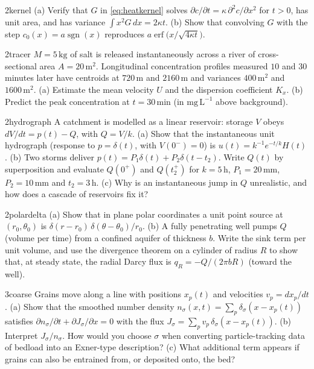 \documentclass[11pt,letterpaper]{article}
\numberwithin{equation}{section}
\newcommand{\units}[1]{\,\mathrm{#1}}
\DeclareMathOperator{\erf}{erf}
\DeclareMathOperator{\sgn}{sgn}
\begin{document}
\begin{exercise}{2}{kernel}
(a) Verify that $G$ in \eqref{eq:heatkernel} solves $\partial c/\partial t=\kappa\,\partial^2c/\partial x^2$ for $t>0$, has unit area, and has
variance $\int x^2G\,dx=2\kappa t$.
(b) Show that convolving $G$ with the step $c_0(x)=a\sgn(x)$ reproduces $a\erf\big(x/\sqrt{4\kappa t}\big)$.
\end{exercise}

\begin{exercise}{2}{tracer}
$M=5\units{kg}$ of salt is released instantaneously across a river of cross-sectional area $A=20\units{m^2}$. Longitudinal
concentration profiles measured $10$ and $30$ minutes later have centroids at $720\units{m}$ and $2160\units{m}$ and variances
$400\units{m^2}$ and $1600\units{m^2}$.
(a) Estimate the mean velocity $U$ and the dispersion coefficient $K_x$.
(b) Predict the peak concentration at $t=30\units{min}$ (in $\mathrm{mg\,L^{-1}}$ above background).
\end{exercise}

\begin{exercise}{2}{hydrograph}
A catchment is modelled as a linear reservoir: storage $V$ obeys $dV/dt=p(t)-Q$, with $Q=V/k$.
(a) Show that the instantaneous unit hydrograph (response to $p=\delta(t)$, with $V(0^-)=0$) is $u(t)=k^{-1}e^{-t/k}H(t)$.
(b) Two storms deliver $p(t)=P_1\delta(t)+P_2\delta(t-t_2)$. Write $Q(t)$ by superposition and evaluate $Q(0^+)$ and
$Q(t_2^+)$ for $k=5\units{h}$, $P_1=20\units{mm}$, $P_2=10\units{mm}$ and $t_2=3\units{h}$.
(c) Why is an instantaneous jump in $Q$ unrealistic, and how does a cascade of reservoirs fix it?
\end{exercise}

\begin{exercise}{2}{polardelta}
(a) Show that in plane polar coordinates a unit point source at $(r_0,\theta_0)$ is $\delta(r-r_0)\,\delta(\theta-\theta_0)/r_0$.
(b) A fully penetrating well pumps $Q$ (volume per time) from a confined aquifer of thickness $b$. Write the sink term per
unit volume, and use the divergence theorem on a cylinder of radius $R$ to show that, at steady state, the radial Darcy flux is
$q_R=-Q/(2\pi bR)$ (toward the well).
\end{exercise}

\begin{exercise}{3}{coarse}
Grains move along a line with positions $x_p(t)$ and velocities $v_p=dx_p/dt$.
(a) Show that the smoothed number density $n_\sigma(x,t)=\sum_p\delta_\sigma(x-x_p(t))$ satisfies
$\partial n_\sigma/\partial t+\partial J_\sigma/\partial x=0$ with the flux $J_\sigma=\sum_pv_p\,\delta_\sigma(x-x_p(t))$.
(b) Interpret $J_\sigma/n_\sigma$. How would you choose $\sigma$ when converting particle-tracking data of bedload into an
Exner-type description?
(c) What additional term appears if grains can also be entrained from, or deposited onto, the bed?
\end{exercise}
\end{document}
